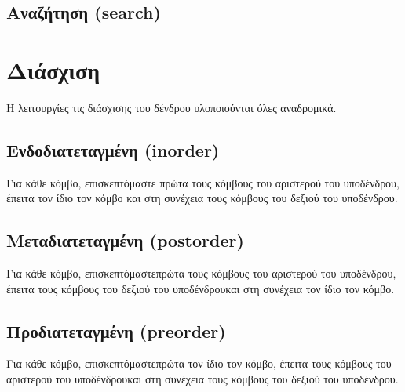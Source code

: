 \subsection{Aναζήτηση (search)}

\section{Διάσχιση}

Η λειτουργίες τις διάσχισης του δένδρου υλοποιούνται όλες αναδρομικά.

\subsection{Ενδοδιατεταγμένη (inorder)}

Για κάθε κόμβο, επισκεπτόμαστε πρώτα τους κόμβους του αριστερού του υποδένδρου, έπειτα τον ίδιο τον κόμβο και στη συνέχεια τους κόμβους του δεξιού του υποδένδρου.

\subsection{Μεταδιατεταγμένη (postorder)}

Για κάθε κόμβο, επισκεπτόμαστεπρώτα τους κόμβους του αριστερού του υποδένδρου, έπειτα τους κόμβους του δεξιού του υποδένδρουκαι στη συνέχεια τον ίδιο τον κόμβο.

\subsection{Προδιατεταγμένη (preorder)}

Για κάθε κόμβο, επισκεπτόμαστεπρώτα τον ίδιο τον κόμβο, έπειτα τους κόμβους του αριστερού του υποδένδρουκαι στη συνέχεια τους κόμβους του δεξιού του υποδένδρου.
